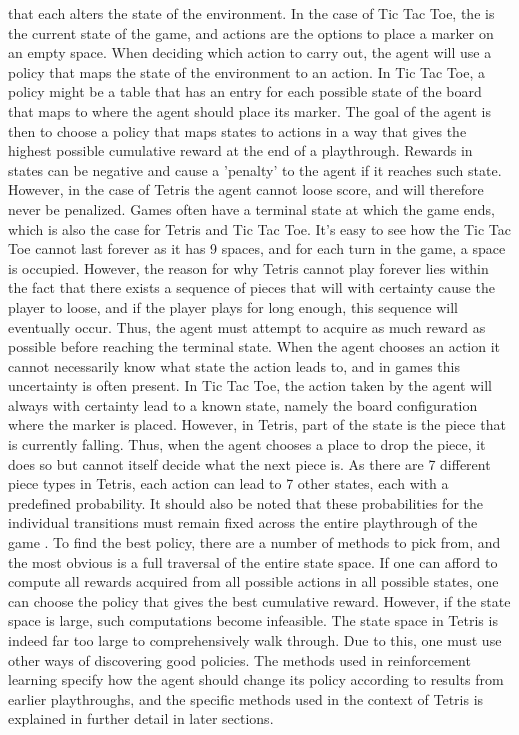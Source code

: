that each alters the state of the environment. In the case of 
Tic Tac Toe, the  is the current state of the game, 
and actions are the options to place a marker
on an empty space.
When deciding which action to carry out, the agent will use
a policy that maps the state of the environment to an action.
In Tic Tac Toe, a policy might be a table that has an entry for each possible
state of the board that maps to where the agent should place its marker.
The goal of the agent is then to choose a policy that maps states to actions 
in a way that
gives the highest possible cumulative reward at the end of a playthrough. 
Rewards in states can be negative and cause a 'penalty' to the agent if it reaches
such state. However, in the case of Tetris the agent cannot loose score,
and will therefore never be penalized.
Games often have a terminal state at which the game ends, which is 
also the case for Tetris and Tic Tac Toe. It's easy to see how the
Tic Tac Toe cannot last forever as it has 9 spaces, and for each turn in the game,
a space is occupied. However, the reason for why Tetris cannot play forever
lies within the fact that there exists a sequence of pieces that will
with certainty cause the player to loose, and if the player plays for 
long enough, this sequence will eventually occur. Thus, the agent must
attempt to acquire as much reward as possible before reaching the terminal 
state. 
When the agent chooses an action it cannot necessarily know what state
the action leads to, and in games this uncertainty is often present.
In Tic Tac Toe, the action taken by the agent will always with certainty 
lead to a known state, namely the board configuration where the marker is placed.
However, in Tetris, part of the state is the piece that is currently falling.
Thus, when the agent chooses a place to drop the piece, it does so 
but cannot itself decide what the next piece is. As there are 7 different piece
types in Tetris, each action can lead to 7 other states, each with a predefined probability.
It should also be noted that these probabilities for the individual transitions
must remain fixed across the entire playthrough of the game \citep{Carr}.
To find the best policy, there are a number of methods to pick from,
and the most obvious is a full traversal of the entire state space.
If one can afford to compute all rewards acquired from all possible 
actions in all possible states, one can choose the policy 
that gives the best cumulative reward. However, if the state space is
large, such computations become infeasible. The state space in Tetris
is indeed far too large to comprehensively walk through.
Due to this, one must use other ways of discovering good policies.
The methods used in reinforcement learning 
specify how the agent should change its policy according to 
results from earlier playthroughs, and the specific methods used in
the context of Tetris is explained in further detail in later sections.


